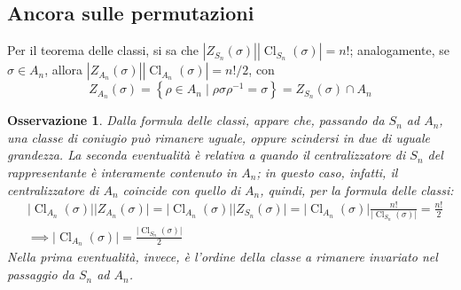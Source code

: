 \documentclass[12pt]{scrartcl}
\theoremstyle{style}
\newtheorem{osservazione}{Osservazione}[section]
\numberwithin{equation}{subsection}
\begin{document}
\subsection{Ancora sulle permutazioni}
Per il teorema delle classi, si sa che $|Z_{S_n} (\sigma )| |\operatorname{Cl}_{S_n}  (\sigma )| = n!$; analogamente, se $\sigma  \in A_n$, allora $|Z_{A_n} (\sigma )| |\operatorname{Cl} _{A_n} (\sigma )| = n! / 2$, con
\[
Z_{A_n} (\sigma ) = \left\{ \rho \in A_n  \mid \rho \sigma \rho ^{-1}= \sigma  \right\} = Z_{S_n} (\sigma ) \cap A_n
\] 
\begin{osservazione}
Dalla formula delle classi, appare che, passando da $S_n$ ad $A_n$, una classe di coniugio pu\`o rimanere uguale, oppure scindersi in due di uguale grandezza.
La seconda eventualit\`a \`e relativa a quando il centralizzatore di $S_n$ del rappresentante \`e interamente contenuto in $A_n$; in questo caso, infatti, il centralizzatore di $A_n$ coincide con quello di $A_n$, quindi, per la formula delle classi:
\[
	\begin{split}
		&\lvert \operatorname{Cl} _{A_n} (\sigma ) \rvert \lvert Z_{A_n} (\sigma ) \rvert =\lvert \operatorname{Cl} _{A_n} (\sigma ) \rvert \lvert Z_{S_n} (\sigma ) \rvert  =\lvert \operatorname{Cl} _{A_n} (\sigma ) \rvert \frac{n!}{\lvert \operatorname{Cl} _{S_n} (\sigma ) \rvert}  =\frac{n!}{2} \\
		&\implies \lvert \operatorname{Cl} _{A_n} (\sigma ) \rvert=\frac{\lvert \operatorname{Cl} _{S_n} (\sigma ) \rvert}{2}
	\end{split}
\] 
Nella prima eventualit\`a, invece, \`e l'ordine della classe a rimanere invariato nel passaggio da $S_n$ ad $A_n$.
\end{osservazione}
\end{document}
